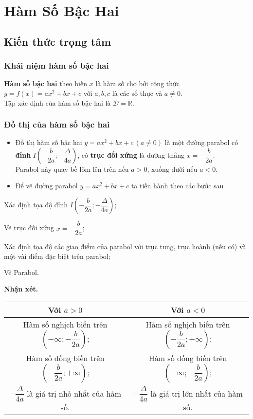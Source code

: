 \setcounter{section}{1}
\section{Hàm Số Bậc Hai}
\subsection{Kiến thức trọng tâm}
\subsubsection{Khái niệm hàm số bậc hai}
\begin{tcolorbox}
\textbf{Hàm số bậc hai} theo biến $x$ là hàm số cho bởi công thức $y=f(x)=ax^2+bx+c$ với $a,b,c$ là các số thực và $a\neq 0$.\\
Tập xác định của hàm số bậc hai là $\mathscr{D}= \mathbb{R}$.
\end{tcolorbox}
\subsubsection{Đồ thị của hàm số bậc hai}
\begin{tcolorbox}
\begin{itemize}
	\item Đồ thị hàm số bậc hai $y=ax^2+bx+c\,(a\ne 0)$ là một đường parabol có \textbf{đỉnh} $I\left(-\dfrac{b}{2a};-\dfrac{\Delta}{4a}\right)$, có \textbf{trục đối xứng} là đường thẳng $x=-\dfrac{b}{2a}$. \\
	Parabol này quay bề lõm lên trên nếu $a>0$, xuống dưới nếu $a<0$.
	\item Để vẽ đường parabol $y=ax^2+bx+c$ ta tiến hành theo các bước sau
\end{itemize}
\begin{enumEX}{1}
\item Xác định tọa độ đỉnh $I\left(-\dfrac{b}{2a};-\dfrac{\Delta}{4a}\right)$;
\item Vẽ trục đối xứng $x=-\dfrac{b}{2a}$;
\item Xác định tọa độ các giao điểm của parabol với trục tung, trục hoành (nếu có) và một vài điểm đặc biệt trên parabol; 
\item Vẽ Parabol.
\end{enumEX}
\end{tcolorbox}
\textbf{Nhận xét.}
\begin{center}
\begin{tabular}{|c|c|}
\hline
Với $a>0$& Với $a<0$\\
\hline
Hàm số nghịch biến trên $\left(-\infty;-\dfrac{b}{2a}\right)$;&Hàm số nghịch biến trên $\left(-\dfrac{b}{2a};+\infty\right)$;\\
Hàm số đồng biến trên $\left(-\dfrac{b}{2a};+\infty\right)$;&Hàm số đồng biến trên $\left(-\infty;-\dfrac{b}{2a}\right)$;\\ $-\dfrac{\Delta}{4a}$ là giá trị nhỏ nhất của hàm số.&$-\dfrac{\Delta}{4a}$ là giá trị lớn nhất của hàm số.\\
\hline	
\end{tabular}
\end{center}
